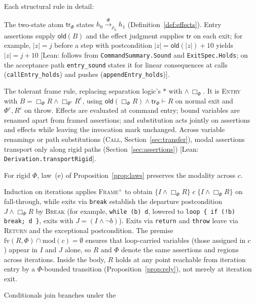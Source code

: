 \documentclass[10pt,a4paper]{article}
\theoremstyle{definition}
\theoremstyle{remark}
\newcommand{\bx}[1]{\Box_{#1}}
\newcommand{\kw}[1]{\mathsf{#1}}
\newcommand{\old}{\kw{old}}
\newcommand{\len}[1]{|#1|}
\newcommand{\tr}[1]{\xrightarrow{#1}}
\newcommand{\hoare}[3]{\{#1\}\;#2\;\{#3\}}
\newcommand{\code}[1]{\texttt{#1}}
\newcommand{\lean}[1]{\texttt{\small #1}}
\newcommand{\status}[1]{\textsf{\small[#1]}}
\begin{document}
\noindent
Each structural rule in detail:
\begin{description}[leftmargin=1.5em,style=nextline]
\item[\textsc{Entry}] The two-state atom $\kw{tr}_\Phi$ states
$h_0\tr{\Phi}_{\rho_0}h_1$ (Definition~\ref{def:effects}). Entry
assertions supply $\old(B)$ and the effect judgment supplies $\kw{tr}$ on
each exit; for example, $\len z=j$ before a step with postcondition
$\len z=\old(\len z)+10$ yields $\len z=j+10$
\status{Lean: follows from \lean{CommandSummary.Sound} and \lean{ExitSpec.Holds}; on the acceptance path \lean{entry\_sound} states it for linear consequences at calls (\lean{callEntry\_holds}) and pushes (\lean{appendEntry\_holds})}.
\item[\textsc{Frame}] The tolerant frame rule, replacing separation
logic's $\ast$ with $\wedge\,\bx{\Phi}$. It is \textsc{Entry} with
$B=\bx{\Phi}R\wedge\bx{\Phi^{e}}R^{e}$, using
$\old(\bx{\Phi}R)\wedge\kw{tr}_\Phi\vdash R$ on normal exit and
$\Phi^{e},R^{e}$ on throw. Effects are evaluated at command entry; bound
variables are renamed apart from framed assertions; and substitution acts
jointly on assertions and effects while leaving the invocation mark
unchanged. Across variable renamings or path substitutions
(\textsc{Call}, Section~\ref{sec:transfer}), modal assertions transport
only along rigid paths (Section~\ref{sec:assertions})
\status{Lean: \lean{Derivation.transportRigid}}.
\item[\textsc{Frame}$^{+}$] For rigid $\Phi$, law~(e) of
Proposition~\ref{prop:laws} preserves the modality across $c$.
\item[\textsc{Loop}] Induction on iterations applies \textsc{Frame}$^{+}$
to obtain $\hoare{I\wedge\bx{\Phi}R}{c}{I\wedge\bx{\Phi}R}$ on
fall-through, while exits via \code{break} establish the departure
postcondition $J\wedge\bx{\Phi}R$ by \textsc{Break} (for example,
\code{while (b) d}, lowered to \code{loop \{ if (!b) break; d \}}, exits
with $J=(I\wedge\neg b)$). Exits via \code{return} and \code{throw} leave
via \textsc{Return} and the exceptional postcondition. The premise
$\mathrm{fv}(R,\Phi)\cap\mathrm{mod}(c)=\emptyset$ ensures that
loop-carried variables (those assigned in $c$) appear in $I$ and $J$
alone, so $R$ and $\Phi$ denote the same assertions and regions across
iterations. Inside the body, $R$ holds at any point reachable from
iteration entry by a $\Phi$-bounded transition
(Proposition~\ref{prop:rely}), not merely at iteration exit.
\item[\textsc{If} and \textsc{Seq}] Conditionals join branches under the

\end{description}
\end{document}
